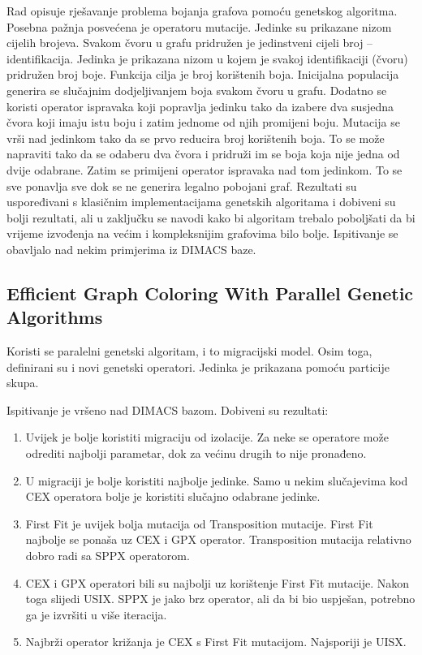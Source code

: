 \documentclass[times, utf8, diplomski, numeric]{fer}
\begin{document}
Rad opisuje rješavanje problema bojanja grafova pomoću genetskog algoritma.
Posebna pažnja posvećena je operatoru mutacije.
Jedinke su prikazane nizom cijelih brojeva. Svakom čvoru u grafu pridružen je jedinstveni cijeli broj -- identifikacija.
Jedinka je prikazana nizom u kojem je svakoj identifikaciji (čvoru)
pridružen broj boje. Funkcija cilja je broj korištenih boja.
Inicijalna populacija generira se slučajnim dodjeljivanjem
boja svakom čvoru u grafu.
Dodatno se koristi operator ispravaka koji popravlja jedinku tako da izabere dva susjedna čvora koji imaju istu boju i zatim jednome od njih promijeni boju.
Mutacija se vrši nad jedinkom tako da se prvo reducira broj korištenih boja. To se može napraviti tako da se odaberu dva čvora i pridruži im se boja koja nije jedna od dvije odabrane.
Zatim se primijeni operator ispravaka nad tom jedinkom. To se sve ponavlja sve dok se ne generira legalno pobojani graf.
Rezultati su uspoređivani s klasičnim implementacijama genetskih algoritama i
dobiveni su bolji rezultati, ali u zaključku se navodi kako bi algoritam trebalo poboljšati da bi vrijeme
izvođenja na većim i kompleksnijim grafovima bilo bolje.
Ispitivanje se obavljalo nad nekim primjerima iz DIMACS baze.

\subsection*{Efficient Graph Coloring With Parallel Genetic Algorithms \cite{lit2}}

Koristi se paralelni genetski algoritam, i to migracijski model. Osim toga,
definirani su i novi genetski operatori. Jedinka je prikazana pomoću 
particije skupa. 

Ispitivanje je vršeno nad DIMACS bazom.
Dobiveni su rezultati:
\begin{enumerate}
\item Uvijek je bolje koristiti migraciju od izolacije. Za neke se operatore može odrediti najbolji parametar, dok za većinu drugih to nije pronađeno.

\item U migraciji je bolje koristiti najbolje jedinke. Samo u nekim slučajevima kod CEX operatora bolje je koristiti slučajno odabrane jedinke.

\item First Fit je uvijek bolja mutacija od Transposition mutacije. First Fit najbolje se ponaša uz CEX i GPX operator. Transposition mutacija relativno dobro radi sa SPPX operatorom.

\item CEX i GPX operatori bili su najbolji uz korištenje First Fit mutacije.
Nakon toga slijedi USIX. SPPX je jako brz operator, ali da bi bio uspješan,
potrebno ga je izvršiti u više iteracija.

\item Najbrži operator križanja je CEX s First Fit mutacijom. Najsporiji je UISX.
\end{enumerate}
\end{document}
